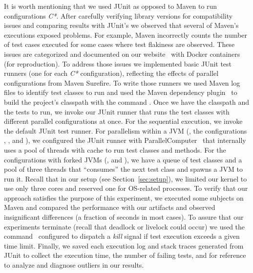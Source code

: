 

It is worth mentioning that we used JUnit as opposed to Maven to run
configurations \emph{C*}.  After carefully verifying library versions
for compatibility issues and comparing results with JUnit's we
observed that several of Maven's executions exposed problems.  For
example, Maven incorrectly counts the number of test cases executed
for some cases where test flakiness are observed.  These issues are
categorized and documented on our website~\cite{ourwebpage} with
Docker containers (for reproduction).  To address those issues we
implemented basic JUnit test runners (one for each \emph{C*}
configuration), reflecting the effects of parallel configurations from
Maven Surefire.  To write those runners we used Maven log files to
identify test classes to run and used the Maven dependency
plugin~\cite{maven-dep} to build the project's classpath with the
command . Once we have the
classpath and the tests to run, we invoke our JUnit runner that runs
the test classes with different parallel configurations at once. For
the sequential execution, we invoke the default JUnit test runner. For
parallelism within a JVM (\ie, the configurations \SeqClassParMeth{},
\ParClassSeqMeth{}, and \ParClassParMeth{}), we configured the JUnit
runner with ParallelComputer~\cite{junit-parallel} that internally
uses a pool of threads with cache to run test classes and methods. For
the configurations with forked JVMs (\ie, \ForkSeq{} and
\ForkParMeth{}), we have a queue of test classes and a pool of three
threads that ``consumes'' the next test class and spawns a JVM to run
it.  Recall that in our setup (see Section~\ref{sec:setup}), we
limited our kernel to use only three cores and reserved one for
OS-related processes.  To verify that our approach satisfies the
purpose of this experiment, we executed some subjects on Maven and
compared the performance with our artifacts and observed
insignificant differences (a fraction of seconds in most cases).  To
assure that our experiments terminate (recall that deadlock or livelock
could occur) we used the  command~\cite{timeout-cmd}
configured to dispatch a \emph{kill} signal if test execution exceeds
a given time limit. Finally, we saved each execution log and stack
traces generated from JUnit to collect the execution time,
the number of failing tests, and for reference to analyze and diagnose
outliers in our results.

